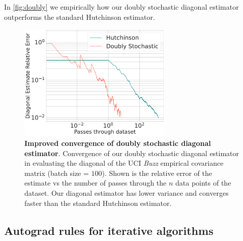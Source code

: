 \documentclass{article}
\begin{document}
In \autoref{fig:doubly} we empirically how our
doubly stochastic diagonal estimator outperforms the
standard Hutchinson estimator.
\begin{figure}
  \centering
    \includegraphics[width=0.65\textwidth]{./figs/diagonal_estimation.pdf}
    \caption{
    \textbf{Improved convergence of doubly stochastic diagonal estimator}.
    Convergence of our doubly stochastic diagonal estimator in evaluating the diagonal of the UCI \emph{Buzz} empirical covariance matrix (batch size = $100$). Shown is the relative error of the estimate vs the number of passes through the $n$ data points of the dataset. Our diagonal estimator has lower variance and converges faster than the standard Hutchinson estimator.}
    \label{fig:doubly}
\end{figure}
\vspace{-3mm}

\subsection{Autograd rules for iterative algorithms} \label{app:autograd}
\end{document}
